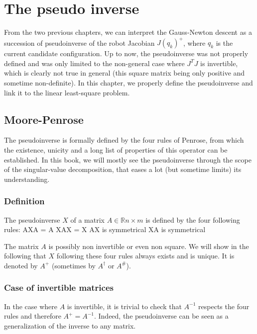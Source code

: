 \documentclass{book}
\begin{document}
\chapter{The pseudo inverse}

From the two previous chapters, we can interpret the  Gauss-Newton descent as a succession of pseudoinverse of the robot Jacobian $J(q_k)^+$, where $q_k$ is the current candidate configuration. Up to now, the pseudoinverse was not properly defined and was only limited to the non-general case where $J^TJ$ is invertible, which is clearly not true in general (this square matrix being only positive and sometime non-definite). In this chapter, we properly define the pseudoinverse and link it to the linear least-square problem.

\section{Moore-Penrose}

The pseudoinverse is formally defined by the four rules of Penrose, from which the existence, unicity and a long list of properties of this operator can be established. In this book, we will mostly see the pseudoinverse through the scope of the singular-value decomposition, that eases a lot (but sometime limits) its understanding. 

\subsection{Definition}

The pseudoinverse $X$ of a matrix $A \in \mathbb{R}{n\times m}$  is defined by the four following rules:
 AXA = A \EOUT
{} XAX = X \EOUT
{} AX \textrm{ is symmetrical} \EOUT
{} XA \textrm{ is symmetrical} \EOUT

The matrix $A$ is possibly non invertible or even non square. We will show in the following that $X$ following these four rules always exists and is unique. It is denoted by $A^+$ (sometimes by $A^\dagger$ or $A^\#$).

\subsection{Case of invertible matrices}
In the case where $A$ is invertible, it is trivial to check that $A^{-1}$ respects the four rules and therefore $A^+ = A^{-1}$. Indeed, the pseudoinverse can be seen as a generalization of the inverse to any matrix. 
\end{document}
